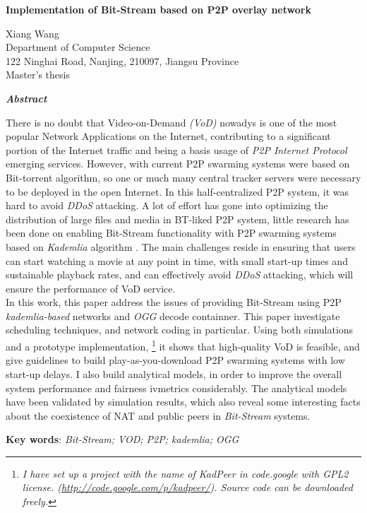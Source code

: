 
\begin{center}
{\large \bf Implementation of Bit-Stream based on P2P overlay network}\\
\end{center}
Xiang Wang\\

Department of Computer Science\\
122 Ninghai Road, Nanjing, 210097, Jiangsu Province\\
Master's thesis\\

\begin{center}
{\bf \emph{Abstract}}\\
\end{center}
{\hspace{1cm}There is no doubt that Video-on-Demand \emph{(VoD)} nowadys is one of the most popular Network Applications on the Internet, contributing to a significant portion of the Internet traffic and being a basis usage of \emph{P2P Internet Protocol} emerging services.
However, with current P2P swarming systems were based on Bit-torrent algorithm, so one or much many central tracker servers were necessary to be deployed in the  open Internet. In this half-centralized P2P system, it was hard to avoid \emph{DDoS} attacking. 
A lot of effort has gone into optimizing the distribution of large files and media in BT-liked P2P system, 
little research has been done on enabling Bit-Stream functionality with P2P swarming systems based on \emph{Kademlia} algorithm . The main challenges reside in ensuring
that users can start watching a movie at any point in time, with small start-up times and sustainable playback rates, and can effectively avoid \emph{DDoS} attacking, which will ensure the performance of VoD service.\\
\hspace*{1cm}{}In this work, this paper address the issues of providing Bit-Stream using P2P \emph{kademlia-based} networks and \emph{OGG} decode containner. This paper investigate scheduling techniques, and network coding in particular. 
Using both simulations and a prototype implementation,
{\footnote{\it{I have set up a project with the name of \emph{KadPeer} in code.google} with GPL2 license. 
(\url{http://code.google.com/p/kadpeer/}). Source code can be downloaded freely.}} 
it shows that high-quality VoD is feasible, 
and give guidelines to build play-as-you-download P2P swarming systems with low start-up delays.
I also build analytical models, in order to improve the overall system performance and fairness
ivmetrics considerably. The analytical models have been validated by simulation results,
which also reveal some interesting facts about the coexistence of NAT and public peers
in \emph{Bit-Stream} systems.}
\vspace*{1cm}

{\bf Key words}:\it{\emph{ Bit-Stream; VOD; P2P; kademlia; OGG}}\\


